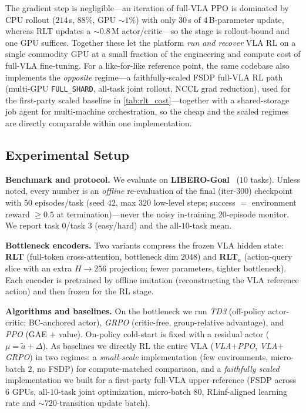 The gradient step is negligible---an iteration of full-VLA PPO is dominated by CPU rollout ($214$\,s, $88\%$, GPU $\sim$$1\%$) with only $30$\,s of $4$\,B-parameter update, whereas RLT updates a ${\sim}0.8$\,M actor/critic---so the stage is rollout-bound and one GPU suffices. Together these let the platform \emph{run and recover} VLA RL on a single commodity GPU at a small fraction of the engineering and compute cost of full-VLA fine-tuning. For a like-for-like reference point, the same codebase also implements the \emph{opposite} regime---a faithfully-scaled FSDP full-VLA RL path (multi-GPU \texttt{FULL\_SHARD}, all-task joint rollout, NCCL grad reduction), used for the first-party scaled baseline in \cref{tab:rlt_cost}---together with a shared-storage job agent for multi-machine orchestration, so the cheap and the scaled regimes are directly comparable within one implementation.

\subsection{Experimental Setup}
\label{sec:rlt_setup}

\textbf{Benchmark and protocol.} We evaluate on \textbf{LIBERO-Goal}~\citep{liu2023libero} ($10$ tasks). Unless noted, every number is an \emph{offline} re-evaluation of the final (iter-$300$) checkpoint with $50$ episodes/task (seed $42$, max $320$ low-level steps; success $=$ environment reward $\ge 0.5$ at termination)---never the noisy in-training $20$-episode monitor. We report task $0$/task $3$ (easy/hard) and the all-$10$-task mean.

\textbf{Bottleneck encoders.} Two variants compress the frozen VLA hidden state: \textbf{RLT} (full-token cross-attention, bottleneck dim $2048$) and \textbf{RLT$_a$} (action-query slice with an extra $H{\to}256$ projection; fewer parameters, tighter bottleneck). Each encoder is pretrained by offline imitation (reconstructing the VLA reference action) and then frozen for the RL stage.

\textbf{Algorithms and baselines.} On the bottleneck we run \emph{TD3} (off-policy actor-critic; BC-anchored actor), \emph{GRPO} (critic-free, group-relative advantage), and \emph{PPO} (GAE $+$ value). On-policy cold-start is fixed with a residual actor ($\mu=\tilde a+\Delta$). As baselines we directly RL the entire VLA (\emph{VLA$+$PPO}, \emph{VLA$+$GRPO}) in two regimes: a \emph{small-scale} implementation (few environments, micro-batch $2$, no FSDP) for compute-matched comparison, and a \emph{faithfully scaled} implementation we built for a first-party full-VLA upper-reference (FSDP across $6$ GPUs, all-$10$-task joint optimization, micro-batch $80$, RLinf-aligned learning rate and $\sim$$720$-transition update batch).

